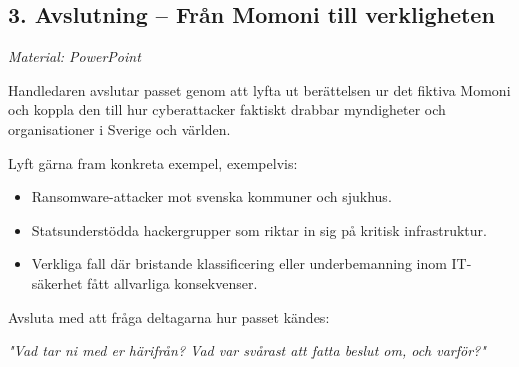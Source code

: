 \documentclass{article}
\begin{document}
\subsection{3. Avslutning – Från Momoni till verkligheten}

\textit{Material: PowerPoint}

Handledaren avslutar passet genom att lyfta ut berättelsen ur det fiktiva Momoni och koppla den till hur cyberattacker faktiskt drabbar myndigheter och organisationer i Sverige och världen.

Lyft gärna fram konkreta exempel, exempelvis:
\begin{itemize}
    \item Ransomware-attacker mot svenska kommuner och sjukhus.
    \item Statsunderstödda hackergrupper som riktar in sig på kritisk infrastruktur.
    \item Verkliga fall där bristande klassificering eller underbemanning inom IT-säkerhet fått allvarliga konsekvenser.
\end{itemize}

Avsluta med att fråga deltagarna hur passet kändes:

\textit{"Vad tar ni med er härifrån? Vad var svårast att fatta beslut om, och varför?"}
\end{document}
